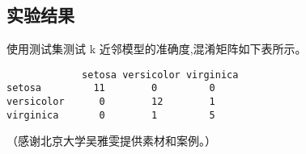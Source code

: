 \subsection{实验结果}\label{ux5b9eux9a8cux7ed3ux679c}

使用测试集测试 k 近邻模型的准确度,混淆矩阵如下表所示。

\begin{lstlisting}
             setosa versicolor virginica
setosa         11        0         0
versicolor      0        12        1
virginica       0        1         5
\end{lstlisting}

（感谢北京大学吴雅雯提供素材和案例。）
